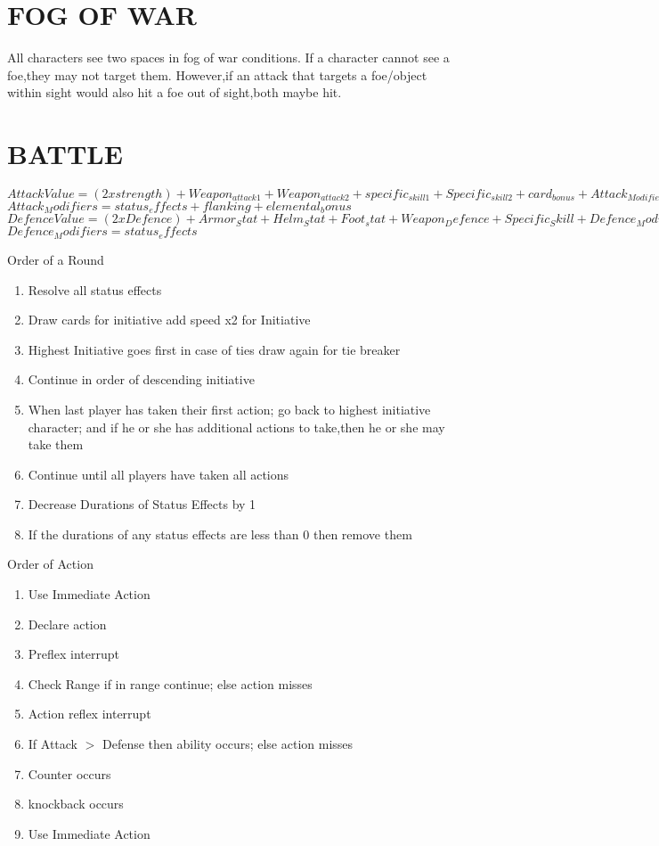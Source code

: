 \section{FOG OF WAR}
All characters see two spaces in fog of war conditions.  If a character cannot see a foe,they may not target them.  However,if an attack that targets a foe/object within sight would also hit a foe out of sight,both maybe hit.  

\section{BATTLE }
$Attack Value = (2 x strength)  + Weapon_{attack1} +Weapon_{attack2}+ specific_{skill1} + Specific_{skill2}  + card_{bonus}+ Attack_{Modifiers}$
$Attack_Modifiers = status_effects+ flanking + elemental_bonus$
$Defence Value = (2 x Defence)+ Armor_Stat+ Helm_Stat + Foot_stat+ Weapon_Defence+ Specific_Skill + Defence_Modifiers+5$
$Defence_Modifiers  =   status_effects$

Order of a Round
\begin{enumerate}
	\item Resolve all status effects 
	\item Draw cards for initiative add speed x2 for Initiative
	\item Highest Initiative goes first in case of ties draw again for tie breaker
	\item Continue in order of descending initiative
	\item When last player has taken their first action; go back to highest initiative character; and if he or she has additional actions to take,then he or she may take them
	\item Continue until all players have taken all actions
	\item Decrease Durations of Status Effects by 1
	\item If the durations of any status effects are less than 0 then remove them
\end{enumerate} 

Order of Action
\begin{enumerate}
	\item Use Immediate Action
	\item Declare action
	\item Preflex interrupt
	\item Check Range if in range continue; else action misses
	\item Action reflex interrupt
	\item If Attack $>$ Defense then ability occurs; else action misses
	\item Counter occurs
	\item knockback occurs
	\item Use Immediate Action
\end{enumerate}

